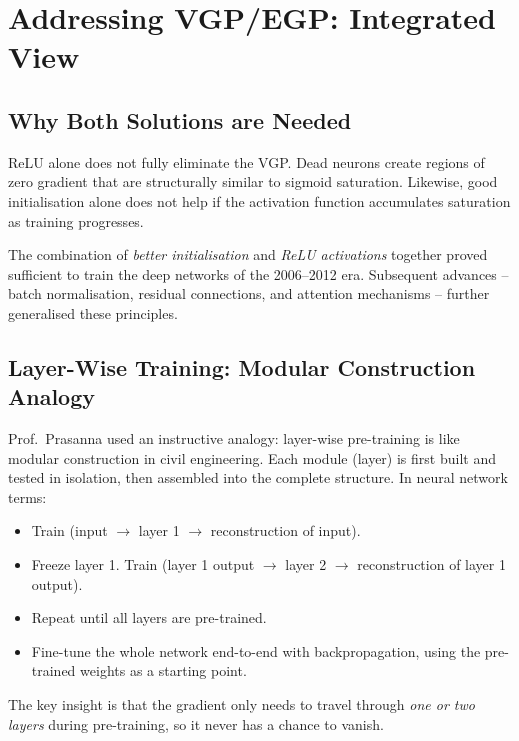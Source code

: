 \documentclass[12pt,a4paper]{article}
\begin{document}
\section{Addressing VGP/EGP: Integrated View}
\label{sec:integrated_view}

\subsection{Why Both Solutions are Needed}
\label{subsec:both_needed}

ReLU alone does not fully eliminate the VGP.  Dead neurons create
regions of zero gradient that are structurally similar to sigmoid
saturation.  Likewise, good initialisation alone does not help if the
activation function accumulates saturation as training progresses.

The combination of \emph{better initialisation} and \emph{ReLU
activations} together proved sufficient to train the deep networks of
the 2006--2012 era.  Subsequent advances -- batch normalisation,
residual connections, and attention mechanisms -- further generalised
these principles.

\subsection{Layer-Wise Training: Modular Construction Analogy}
\label{subsec:layerwise}

Prof.\ Prasanna used an instructive analogy: layer-wise pre-training
is like modular construction in civil engineering.  Each module (layer)
is first built and tested in isolation, then assembled into the
complete structure.  In neural network terms:

\begin{itemize}
  \item Train (input $\to$ layer 1 $\to$ reconstruction of input).
  \item Freeze layer 1.  Train (layer 1 output $\to$ layer 2 $\to$
        reconstruction of layer 1 output).
  \item Repeat until all layers are pre-trained.
  \item Fine-tune the whole network end-to-end with backpropagation,
        using the pre-trained weights as a starting point.
\end{itemize}

The key insight is that the gradient only needs to travel through
\emph{one or two layers} during pre-training, so it never has a chance
to vanish.
\end{document}
